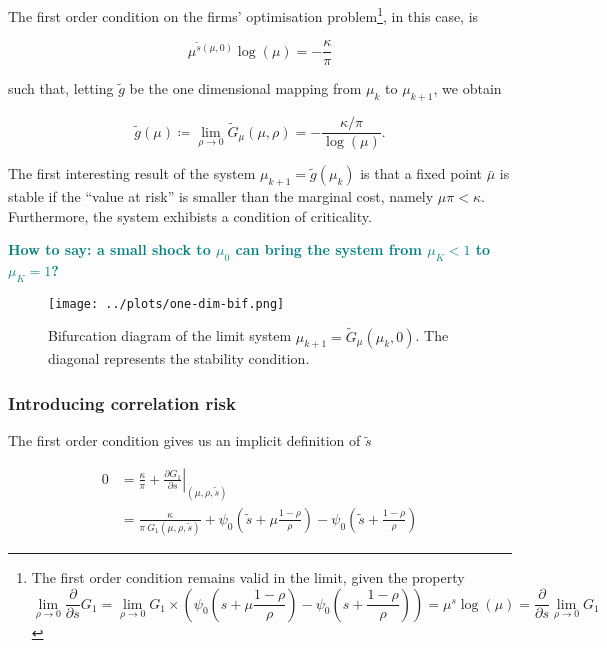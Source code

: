 \documentclass[american, abstract=on]{scrartcl}
\theoremstyle{plain}
\newcommand\notes[1]{\textcolor{teal}{\footnotesize \textbf{#1}}}
\begin{document}
The first order condition on the firms' optimisation problem\footnote{
  The first order condition remains valid in the limit, given the property
  \begin{equation}
    \lim_{\rho \rightarrow 0} \frac{\partial}{\partial s}G_1 = \lim_{\rho \rightarrow 0} G_1 \times \left(\psi_0\left(s + \mu \frac{1 - \rho}{\rho} \right) - \psi_0\left(s + \frac{1 - \rho}{\rho} \right) \right) = \mu^{s} \log(\mu) = \frac{\partial}{\partial s} \lim_{\rho \rightarrow 0} G_1
  \end{equation}
}, in this case, is

\begin{equation}
  \mu^{\tilde{s}(\mu, 0)} \log(\mu) = -\frac{\kappa}{\pi}
\end{equation}

such that, letting $\tilde{g}$ be the one dimensional mapping from $\mu_{k}$ to $\mu_{k + 1}$, we obtain

\begin{equation}
  \tilde{g}(\mu) \coloneqq \lim_{\rho \rightarrow 0}\tilde{G}_\mu(\mu, \rho) = -\frac{\kappa / \pi}{\log(\mu)}.
\end{equation}

The first interesting result of the system $\mu_{k + 1} = \tilde{g}(\mu_k)$ is that a fixed point $\bar{\mu}$ is stable if the ``value at risk'' is smaller than the marginal cost, namely $\mu \pi < \kappa$. Furthermore, the system exhibists a condition of criticality. 

\notes{How to say: a small shock to $\mu_0$ can bring the system from $\mu_{K} < 1$ to $\mu_K = 1$?}

\begin{figure}[H]
  \centering
  \texttt{[image: ../plots/one-dim-bif.png]}
  \caption{Bifurcation diagram of the limit system $\mu_{k + 1} = \tilde{G}_{\mu}(\mu_k, 0)$. The diagonal represents the stability condition.}
  \label{fig:one-dimensional-bifurcation}
\end{figure}

\subsubsection{Introducing correlation risk}

The first order condition gives us an implicit definition of $\tilde{s}$ 

\begin{equation}
  \begin{split}
    0 &= \frac{\kappa}{\pi} + \left. \frac{\partial G_1}{\partial s} \right\vert_{(\mu, \rho, \tilde{s})}  \\
    &= \frac{\kappa}{\pi \ G_1(\mu, \rho, \tilde{s})} + \psi_0\left(\tilde{s} + \mu \frac{1 - \rho}{\rho} \right) - \psi_0\left(\tilde{s} + \frac{1 - \rho}{\rho} \right)  
  \end{split}
\end{equation}
\end{document}
